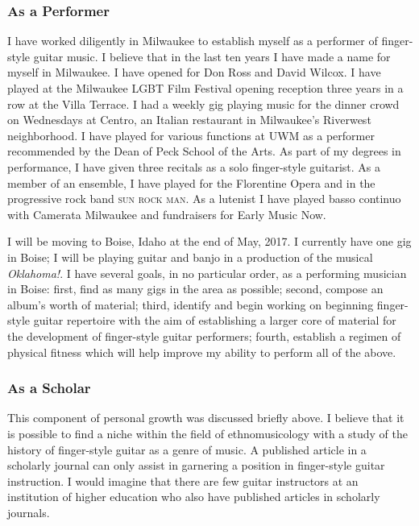 \documentclass[12pt]{article}
\begin{document}
\subsubsection{As a Performer}
\label{sec:performer}
I have worked diligently in Milwaukee to establish myself as a
performer of finger-style guitar music. I believe that in the last ten
years I have made a name for myself in Milwaukee. I have opened for
Don Ross and David Wilcox. I have played at the Milwaukee LGBT Film
Festival opening reception three years in a row at the Villa
Terrace. I had a weekly gig playing music for the dinner crowd on
Wednesdays at Centro, an Italian restaurant in Milwaukee's Riverwest
neighborhood. I have played for various functions at UWM as a
performer recommended by the Dean of Peck School of the Arts. As part
of my degrees in performance, I have given three recitals as a solo
finger-style guitarist. As a member of an ensemble, I have played for
the Florentine Opera and in the progressive rock band \textsc{sun rock
  man}. As a lutenist I have played basso continuo with Camerata
Milwaukee and fundraisers for Early Music Now.

I will be moving to Boise, Idaho at the end of May, 2017. I currently
have one gig in Boise; I will be playing guitar and banjo in a
production of the musical \emph{Oklahoma!}. I have several goals, in
no particular order, as a performing musician in Boise: first, find as
many gigs in the area as possible; second, compose an album's worth of
material; third, identify and begin working on beginning finger-style
guitar repertoire with the aim of establishing a larger core of
material for the development of finger-style guitar performers;
fourth, establish a regimen of physical fitness which will help
improve my ability to perform all of the above.

\subsubsection{As a Scholar}
\label{sec:scholar}
This component of personal growth was discussed briefly above. I
believe that it is possible to find a niche within the field of
ethnomusicology with a study of the history of finger-style guitar as
a genre of music. A published article in a scholarly journal can only
assist in garnering a position in finger-style guitar instruction. I
would imagine that there are few guitar instructors at an institution
of higher education who also have published articles in scholarly
journals. 
\end{document}

